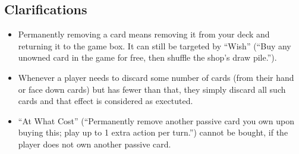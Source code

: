 \documentclass[dvipsnames,parskip,a4paper]{scrartcl}
\begin{document}
\subsection*{Clarifications}

\begin{itemize}
\item Permanently removing a card means removing it from your deck and returning it to the game box. It can still be targeted by ``Wish'' (``Buy any unowned card in the game for free, then shuffle the shop's draw pile.'').
\item Whenever a player needs to discard some number of cards (from their hand or face down cards) but has fewer than that, they simply discard all such cards and that effect is considered as exectuted.
\item ``At What Cost'' (``Permanently remove another passive card you own upon buying this; play up to 1 extra action per turn.'') cannot be bought, if the player does not own another passive card.
\end{itemize}

\newpage
\end{document}
